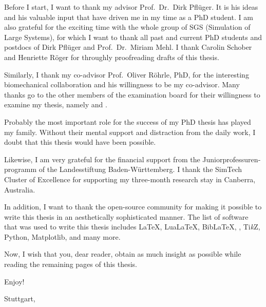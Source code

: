 
Before I start, I want to thank my advisor Prof.\ Dr.\ Dirk Pflüger.
It is his ideas and his valuable input that have driven me in
my time as a PhD student.
I am also grateful for the exciting time with the whole group of SGS
(Simulation of Large Systems),
for which I want to thank all past and current PhD students and postdocs of
Dirk Pflüger and Prof.\ Dr.\ Miriam Mehl.
I thank Carolin Schober and Henriette Röger for throughly proofreading
drafts of this thesis.

Similarly, I thank my co-advisor Prof.\ Oliver Röhrle, PhD, for the
interesting biomechanical collaboration and his willingness to be my co-advisor.
Many thanks go to the other members of the examination board for their
willingness to examine my thesis,
namely  and .

Probably the most important role for the success of my PhD thesis
has played my family.
Without their mental support and distraction from the daily work,
I doubt that this thesis would have been possible.

Likewise, I am very grateful for the financial support from
the \foreignlanguage{ngerman}{Juniorprofessurenprogramm} of the
\foreignlanguage{ngerman}{Landesstiftung Baden-Württemberg}.
I thank the SimTech Cluster of Excellence for supporting
my three-month research stay in Canberra, Australia.

In addition, I want to thank the open-source community for making it possible to
write this thesis in an aesthetically sophisticated manner.
The list of software that was used to write this thesis includes
\LaTeX, Lua\LaTeX, Bib\LaTeX,
\scalebox{0.9}{\KOMAScript}, Ti\emph{k}Z, Python, Matplotlib,
and many more.

\label{page:preface}
Now, I wish that you, dear reader, obtain as much insight as possible
while reading the remaining
 pages of this thesis.

Enjoy!

\vspace{1em}

\noindent
Stuttgart, \thedate

\noindent
\theauthor
